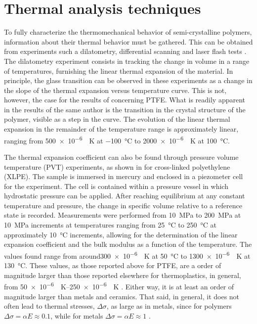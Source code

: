 \section{Thermal analysis techniques}

To fully characterize the thermomechanical behavior of semi-crystalline polymers, information about their thermal behavior must be gathered.
This can be obtained from experiments such a dilatometry, differential scanning and laser flash tests \citep{blummCharacterizationPTFEUsing2010}.
The dilatometry experiment consists in tracking the change in volume in a range of temperatures, furnishing the linear thermal expansion of the material.
In principle, the glass transition can be observed in these experiments as a change in the slope of the thermal expansion versus temperature curve.
This is not, however, the case for the results of \cite{blummCharacterizationPTFEUsing2010} concerning PTFE.
What is readily apparent in the results of the same author is the transition in the crystal structure of the polymer, visible as a step in the curve.
The evolution of the linear thermal expansion in the remainder of the temperature range is approximately linear, ranging from \SI{500e-6}{\per\kelvin} at \SI{-100}{\celsius} to \SI{2000e-6}{\per\kelvin} at \SI{100}{\celsius}.

The thermal expansion coefficient can also be found through pressure volume temperature (PVT) experiments, as shown in \cite{olaszViscoelasticModelCrossLinked2005} for cross-linked polyethylene (XLPE).
The sample is immersed in mercury and enclosed in a piezometer cell for the experiment.
The cell is contained within a pressure vessel in which hydrostatic pressure can be applied.
After reaching equilibrium at any constant temperature and pressure, the change in specific volume relative to a reference state is recorded.
Measurements were performed from \SI{10}{\mega\pascal} to \SI{200}{\mega\pascal} at \SI{10}{\mega\pascal} increments at temperatures ranging from \SI{25}{\celsius} to \SI{250}{\celsius} at approximately \SI{10}{\celsius} increments, allowing for the determination of the linear expansion coefficient and the bulk modulus as a function of the temperature.
The values found range from  around\SI{300e-6}{\per\kelvin} at \SI{50}{\celsius} to \SI{1300e-6}{\per\kelvin} at \SI{130}{\celsius}.
These values, as those reported above for PTFE, are a order of magnitude larger than those reported elsewhere for thermoplastics, in general, from \SIrange{50e-6}{250e-6}{\per\kelvin} \citep{ashbyMaterialsSelectionMechanical1999}.
Either way, it is at least an order of magnitude larger than metals and ceramics.
That said, in general, it does not often lead to thermal stresses, $\Delta \sigma$, as large as in metals, since for polymers $\Delta \sigma = \alpha E \approx 0.1$, while for metals $\Delta \sigma = \alpha E \approx 1$ \citep{ashbyMaterialsSelectionMechanical1999}.

